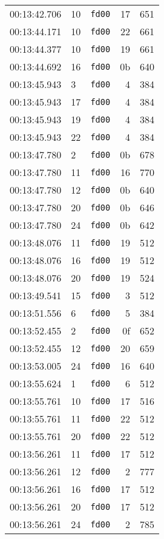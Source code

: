 \documentclass{article}
\begin{document}
\begin{longtable}{lllrr}
00:13:42.706 & 10 & \texttt{fd00} & 17 & 651 \\
00:13:44.171 & 10 & \texttt{fd00} & 22 & 661 \\
00:13:44.377 & 10 & \texttt{fd00} & 19 & 661 \\
00:13:44.692 & 16 & \texttt{fd00} & 0b & 640 \\
00:13:45.943 & 3 & \texttt{fd00} & 4 & 384 \\
00:13:45.943 & 17 & \texttt{fd00} & 4 & 384 \\
00:13:45.943 & 19 & \texttt{fd00} & 4 & 384 \\
00:13:45.943 & 22 & \texttt{fd00} & 4 & 384 \\
00:13:47.780 & 2 & \texttt{fd00} & 0b & 678 \\
00:13:47.780 & 11 & \texttt{fd00} & 16 & 770 \\
00:13:47.780 & 12 & \texttt{fd00} & 0b & 640 \\
00:13:47.780 & 20 & \texttt{fd00} & 0b & 646 \\
00:13:47.780 & 24 & \texttt{fd00} & 0b & 642 \\
00:13:48.076 & 11 & \texttt{fd00} & 19 & 512 \\
00:13:48.076 & 16 & \texttt{fd00} & 19 & 512 \\
00:13:48.076 & 20 & \texttt{fd00} & 19 & 524 \\
00:13:49.541 & 15 & \texttt{fd00} & 3 & 512 \\
00:13:51.556 & 6 & \texttt{fd00} & 5 & 384 \\
00:13:52.455 & 2 & \texttt{fd00} & 0f & 652 \\
00:13:52.455 & 12 & \texttt{fd00} & 20 & 659 \\
00:13:53.005 & 24 & \texttt{fd00} & 16 & 640 \\
00:13:55.624 & 1 & \texttt{fd00} & 6 & 512 \\
00:13:55.761 & 10 & \texttt{fd00} & 17 & 516 \\
00:13:55.761 & 11 & \texttt{fd00} & 22 & 512 \\
00:13:55.761 & 20 & \texttt{fd00} & 22 & 512 \\
00:13:56.261 & 11 & \texttt{fd00} & 17 & 512 \\
00:13:56.261 & 12 & \texttt{fd00} & 2 & 777 \\
00:13:56.261 & 16 & \texttt{fd00} & 17 & 512 \\
00:13:56.261 & 20 & \texttt{fd00} & 17 & 512 \\
00:13:56.261 & 24 & \texttt{fd00} & 2 & 785 \\

\end{longtable}
\end{document}
